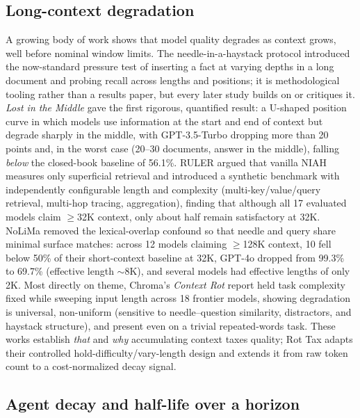 \documentclass[11pt]{article}
\begin{document}
\subsection{Long-context degradation}
\label{sec:rw-degradation}

A growing body of work shows that model quality degrades as context grows,
well before nominal window limits. The needle-in-a-haystack protocol
\cite{kamradt2023niah} introduced the now-standard pressure test of inserting
a fact at varying depths in a long document and probing recall across lengths
and positions; it is methodological tooling rather than a results paper, but
every later study builds on or critiques it. \emph{Lost in the Middle}
\cite{liu2024lostmiddle} gave the first rigorous, quantified result: a
U-shaped position curve in which models use information at the start and end
of context but degrade sharply in the middle, with GPT-3.5-Turbo dropping more
than 20 points and, in the worst case (20--30 documents, answer in the
middle), falling \emph{below} the closed-book baseline of 56.1\%. RULER
\cite{hsieh2024ruler} argued that vanilla NIAH measures only superficial
retrieval and introduced a synthetic benchmark with independently configurable
length and complexity (multi-key/value/query retrieval, multi-hop tracing,
aggregation), finding that although all 17 evaluated models claim
$\geq$32K context, only about half remain satisfactory at 32K. NoLiMa
\cite{modarressi2025nolima} removed the lexical-overlap confound so that
needle and query share minimal surface matches: across 12 models claiming
$\geq$128K context, 10 fell below 50\% of their short-context baseline at 32K,
GPT-4o dropped from 99.3\% to 69.7\% (effective length $\sim$8K), and several
models had effective lengths of only 2K. Most directly on theme, Chroma's
\emph{Context Rot} report \cite{hong2025contextrot} held task complexity fixed
while sweeping input length across 18 frontier models, showing degradation is
universal, non-uniform (sensitive to needle--question similarity, distractors,
and haystack structure), and present even on a trivial repeated-words task.
These works establish \emph{that} and \emph{why} accumulating context taxes
quality; Rot Tax adapts their controlled hold-difficulty/vary-length design
and extends it from raw token count to a cost-normalized decay signal.

\subsection{Agent decay and half-life over a horizon}
\label{sec:rw-decay}
\end{document}
